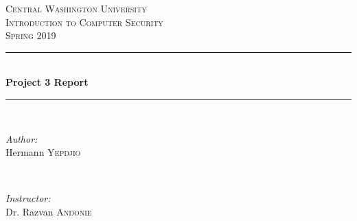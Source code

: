 \documentclass[12pt]{article}
\begin{document}
	
	\begin{titlepage}
		
		\newcommand{\HRule}{\rule{\linewidth}{0.5mm}} %
		
		\center %
		
		
		\textsc{\LARGE Central Washington University}\\[1.5cm] %
		\textsc{\Large Introduction to Computer Security}\\[0.5cm] %
		\textsc{\large Spring 2019}\\[0.5cm] %
		
		
		\HRule \\[0.4cm]
		{ \huge \bfseries Project 3 Report}\\[0.4cm] %
		\HRule \\[1.5cm]
		
		
		\begin{minipage}{0.4\textwidth}
			\begin{flushleft} \large
				\emph{Author:}\\
				Hermann \textsc{Yepdjio} %
			\end{flushleft}
		\end{minipage}
		~
		\begin{minipage}{0.4\textwidth}
			\begin{flushright} \large
				\emph{Instructor:} \\
				Dr. Razvan \textsc{Andonie} %
			\end{flushright}
		\end{minipage}\\[1cm]
		

\end{titlepage}
\end{document}
